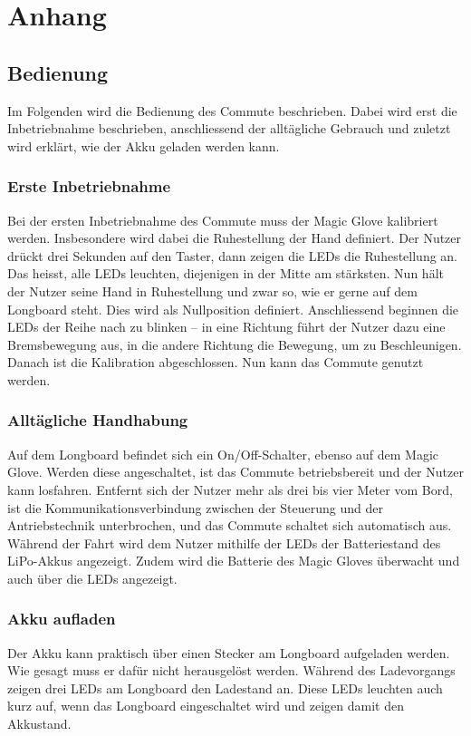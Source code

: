 \chapter{Anhang}\label{chp:Anhang}


\section{Bedienung}
Im Folgenden wird die Bedienung des Commute beschrieben. Dabei wird erst die Inbetriebnahme beschrieben, anschliessend der alltägliche Gebrauch und zuletzt wird erklärt, wie der Akku geladen werden kann.
\subsection*{Erste Inbetriebnahme}
Bei der ersten Inbetriebnahme des Commute muss der Magic Glove kalibriert werden. Insbesondere wird dabei die Ruhestellung der Hand definiert. Der Nutzer drückt drei Sekunden auf den Taster, dann zeigen die LEDs die Ruhestellung an. Das heisst, alle LEDs leuchten, diejenigen in der Mitte am stärksten. Nun hält der Nutzer seine Hand in Ruhestellung und zwar so, wie er gerne auf dem Longboard steht. Dies wird als Nullposition definiert. Anschliessend beginnen die LEDs der Reihe nach zu blinken – in eine Richtung führt der Nutzer dazu eine Bremsbewegung aus, in die andere Richtung die Bewegung, um zu Beschleunigen. Danach ist die Kalibration abgeschlossen. Nun kann das Commute genutzt werden.
\subsection*{Alltägliche Handhabung}
Auf dem Longboard befindet sich ein On/Off-Schalter, ebenso auf dem Magic Glove. Werden diese angeschaltet, ist das Commute betriebsbereit und der Nutzer kann losfahren. 
Entfernt sich der Nutzer mehr als drei bis vier Meter vom Bord, ist die Kommunikationsverbindung zwischen der Steuerung und der Antriebstechnik unterbrochen, und das Commute schaltet sich automatisch aus. Während der Fahrt wird dem Nutzer mithilfe der LEDs der Batteriestand des LiPo-Akkus angezeigt. Zudem wird die Batterie des Magic Gloves überwacht und auch über die LEDs angezeigt. 
\subsection*{Akku aufladen}
Der Akku kann praktisch über einen Stecker am Longboard aufgeladen werden. Wie gesagt muss er dafür nicht herausgelöst werden. Während des Ladevorgangs zeigen drei LEDs am Longboard den Ladestand an. Diese LEDs leuchten auch kurz auf, wenn das Longboard eingeschaltet wird und zeigen damit den Akkustand. 


